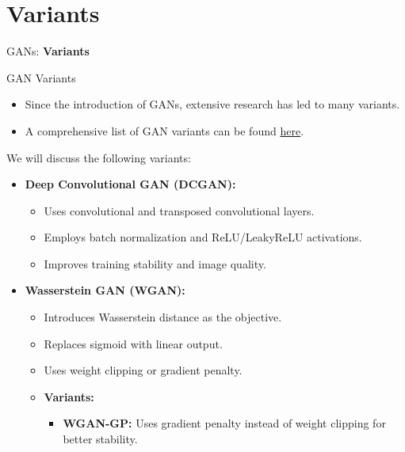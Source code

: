 \section{Variants}
\begin{frame}{}
    \LARGE GANs: \textbf{Variants}
\end{frame}

\begin{frame}[allowframebreaks]{GAN Variants}
\begin{itemize}
    \item Since the introduction of GANs, extensive research has led to many variants.
    \item A comprehensive list of GAN variants can be found \href{https://github.com/hindupuravinash/the-gan-zoo}{here}.
\end{itemize} 
    \framebreak
    
    We will discuss the following variants:
    \begin{itemize}
        \item \textbf{Deep Convolutional GAN (DCGAN):}
        \begin{itemize}
            \item Uses convolutional and transposed convolutional layers.
            \item Employs batch normalization and ReLU/LeakyReLU activations.
            \item Improves training stability and image quality.
        \end{itemize}
        \item \textbf{Wasserstein GAN (WGAN):} 
        \begin{itemize}
            \item Introduces Wasserstein distance as the objective.
            \item Replaces sigmoid with linear output.
            \item Uses weight clipping or gradient penalty.
            \item \textbf{Variants:}
            \begin{itemize}
                \item \textbf{WGAN-GP:} Uses gradient penalty instead of weight clipping for better stability.
            \end{itemize}
        \end{itemize}

\framebreak


\end{itemize}
\end{frame}
